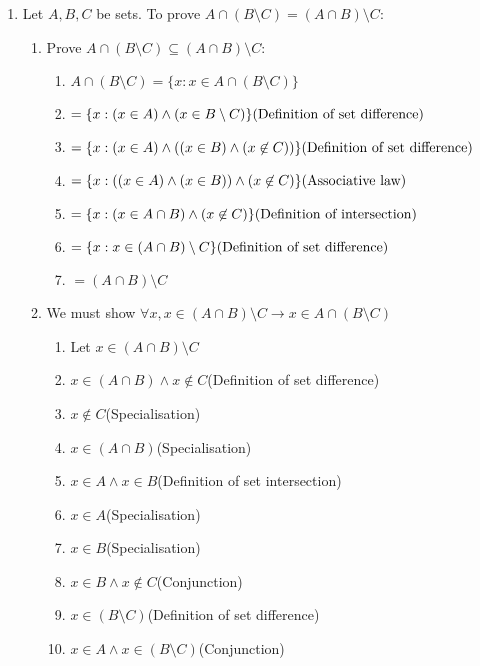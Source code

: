 \documentclass[12pt, a4paper]{article}
\begin{document}
\begin{enumerate}[Q\arabic*.]
  \item Let $A, B, C$ be sets. To prove $A \cap (B \setminus C) = (A \cap B) \setminus C$: 
    \begin{enumerate}[\arabic*.]
      \item Prove $A \cap (B \setminus C) \subseteq (A \cap B) \setminus C$:
        \begin{enumerate}[label=1.\arabic*]
          \item $A \cap (B \setminus C) = \{x: x \in A \cap (B \setminus C)\}$
          \item $= \{x: (x \in A) \land (x \in B \setminus C)\}\hfill\text{(Definition of set difference)}$
          \item $= \{x: (x \in A) \land ((x \in B) \land (x \not\in C))\}\hfill\text{(Definition of set difference)}$
          \item $= \{x: ((x \in A) \land (x \in B)) \land (x \not\in C)\}\hfill\text{(Associative law)}$
          \item $= \{x: (x \in A \cap B) \land (x \not\in C)\}\hfill\text{(Definition of intersection)}$
          \item $= \{x: x \in (A \cap B) \setminus C\}\hfill\text{(Definition of set difference)}$
          \item $= (A \cap B) \setminus C$
        \end{enumerate}
      \item We must show $\forall x, x \in (A \cap B) \setminus C \rightarrow x \in A \cap (B \setminus C)$
        \begin{enumerate}[label=1.\arabic*]
          \item Let $x \in (A \cap B) \setminus C$
          \item $x \in (A \cap B) \land x \not\in C$\hfill(Definition of set difference)
          \item $x \not\in C$\hfill(Specialisation)
          \item $x \in (A \cap B)$\hfill(Specialisation)
          \item $x \in A \land x \in B$\hfill(Definition of set intersection)
          \item $x \in A$\hfill(Specialisation)
          \item $x \in B$\hfill(Specialisation)
          \item $x \in B \land x \not\in C$\hfill(Conjunction)
          \item $x \in (B \setminus C)$\hfill(Definition of set difference)
          \item $x \in A \land x \in (B \setminus C)$\hfill(Conjunction)

\end{enumerate}
\end{enumerate}
\end{enumerate}
\end{document}
